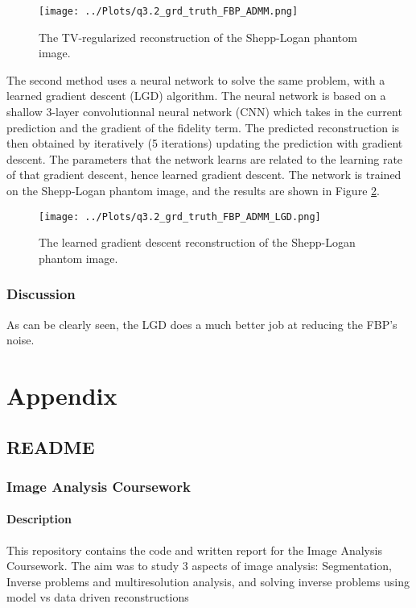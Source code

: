 \documentclass[12pt]{report} %
\begin{document}
\begin{figure}[htbp]
    \centering
    \texttt{[image: ../Plots/q3.2\_grd\_truth\_FBP\_ADMM.png]}
    \caption{The TV-regularized reconstruction of the Shepp-Logan phantom image.}
    \label{fig:tv_reconstruction}
\end{figure}

The second method uses a neural network to solve the same problem, with a learned gradient descent (LGD) algorithm. The neural network is based on a shallow 3-layer convolutionnal neural network (CNN) which takes in the current prediction and the gradient of the fidelity term. The predicted reconstruction is then obtained by iteratively (5 iterations) updating the prediction with gradient descent. The parameters that the network learns are related to the learning rate of that gradient descent, hence learned gradient descent. The network is trained on the Shepp-Logan phantom image, and the results are shown in Figure \ref{fig:learned_reconstruction}.

\begin{figure}[htbp]
    \centering
    \texttt{[image: ../Plots/q3.2\_grd\_truth\_FBP\_ADMM\_LGD.png]}
    \caption{The learned gradient descent reconstruction of the Shepp-Logan phantom image.}
    \label{fig:learned_reconstruction}
\end{figure}


\subsection{Discussion}

As can be clearly seen, the LGD does a much better job at reducing the FBP's noise.


\chapter{Appendix}

\section{README}

\subsection{Image Analysis Coursework}

\subsubsection{Description}
This repository contains the code and written report for the Image Analysis Coursework. The aim was to study 3 aspects of image analysis: Segmentation, Inverse problems and multiresolution analysis, and solving inverse problems using model vs data driven reconstructions
\end{document}
